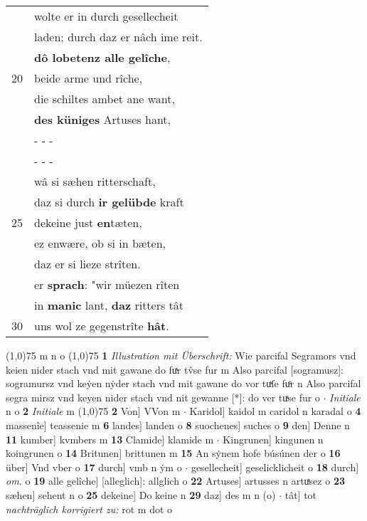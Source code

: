 \documentclass[8pt,a4paper,notitlepage]{article}
\begin{document}
\begin{table}[ht]
\begin{minipage}[t]{0.5\linewidth}
\begin{tabular}{rl}
 & wolte er in durch gesellecheit\\ 
 & laden; durch daz er nâch ime reit.\\ 
 & \textbf{dô lobetenz alle gelîche},\\ 
20 & beide arme und rîche,\\ 
 & die schiltes ambet ane want,\\ 
 & \textbf{des küniges} Artuses hant,\\ 
 & \multicolumn{1}{l}{ - - - }\\ 
 & \multicolumn{1}{l}{ - - - }\\ 
 & wâ si sæhen ritterschaft,\\ 
 & daz si durch \textbf{ir gelübde} kraft\\ 
25 & dekeine just \textbf{en}tæten,\\ 
 & ez enwære, ob si in bæten,\\ 
 & daz er si lieze strîten.\\ 
 & er \textbf{sprach}: "wir müezen rîten\\ 
 & in \textbf{manic} lant, \textbf{daz} ritters tât\\ 
30 & uns wol ze gegenstrîte \textbf{hât}.\\ 
\end{tabular}
\scriptsize
\line(1,0){75} \newline
m n o \newline
\line(1,0){75} \newline
\textbf{1} \textit{Illustration mit Überschrift:} Wie parcifal Segramors vnd keien nider stach vnd mit gawane do fuͯr tv̂se fur m  Also parcifal [sogramusz]: sogramursz vnd keẏen nẏder stach vnd mit gawane do vor tuͯſe fuͦr n  Also parcifal segra mirsz vnd keyen nider stach vnd nit gewanne [*]: do ver tuͯse fur o   $\cdot$ \textit{Initiale} n o  \textbf{2} \textit{Initiale} m  \newline
\line(1,0){75} \newline
\textbf{2} Von] VVon m  $\cdot$ Karidol] kaidol m caridol n karadal o \textbf{4} massenîe] teassenie m \textbf{6} landes] landen o \textbf{8} suochenes] suches o \textbf{9} den] Denne n \textbf{11} kumber] kvmbers m \textbf{13} Clamide] klamide m  $\cdot$ Kingrunen] kingunen n koingrunen o \textbf{14} Britunen] brittunen m \textbf{15} An sẏnem hofe búsúnen der o \textbf{16} über] Vnd vber o \textbf{17} durch] vmb n ẏm o  $\cdot$ gesellecheit] geselicklicheit o \textbf{18} durch] \textit{om.} o \textbf{19} alle gelîche] [alleglich]: allglich o \textbf{22} Artuses] artusses n artuͯsez o \textbf{23} sæhen] sehent n o \textbf{25} dekeine] Do keine n \textbf{29} daz] des m n (o)  $\cdot$ tât] tot \textit{nachträglich korrigiert zu:} rot m dot o \newline
\end{minipage}
\end{table}
\end{document}
